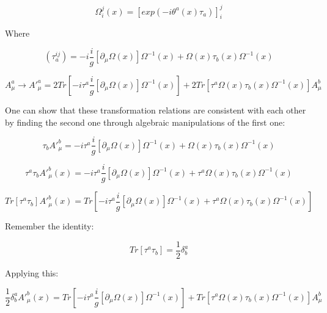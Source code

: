 \documentclass[a4]{article}
\begin{document}
    \begin{equation}
        \Omega_{i}^{j} (x) = [exp (-i \theta^{a} (x) \tau_{a})]_{i}^{j}
    \end{equation}

    Where

    \begin{equation}
        (\tau_{a}^{ij}) = - i \frac{i}{g} [\partial_{\mu} \Omega (x)] \Omega^{-1} (x) + \Omega (x) \tau_{b} (x) \Omega^{-1} (x)
    \end{equation}

    \begin{equation}
        A^{a}_{\mu} \rightarrow A'^{a}_{\mu} = 2 Tr [- i \tau^{a} \frac{i}{g} [\partial_{\mu} \Omega (x)] \Omega^{-1} (x)] + 2 Tr [\tau^{a} \Omega (x) \tau_{b} (x) \Omega^{-1} (x)] A_{\mu}^{b}
    \end{equation}

    One can show that these transformation relations are consistent with each other by finding the second one through algebraic manipulations
    of the first one:

    \begin{equation}
        \tau_{b} A'^{b}_{\mu} = - i \tau^{a} \frac{i}{g} [\partial_{\mu} \Omega (x)] \Omega^{-1} (x) + \Omega (x) \tau_{b} (x) \Omega^{-1} (x)
    \end{equation}

    \begin{equation}
        \tau^{a} \tau_{b} A'^{b}_{\mu} (x) = - i \tau^{a} \frac{i}{g} [\partial_{\mu} \Omega (x)] \Omega^{-1} (x) + \tau^{a} \Omega (x) \tau_{b} (x) \Omega^{-1} (x)
    \end{equation}

    \begin{equation}
        Tr[\tau^{a} \tau_{b}] A'^{b}_{\mu} (x) = Tr [- i \tau^{a} \frac{i}{g} [\partial_{\mu} \Omega (x)] \Omega^{-1} (x) + \tau^{a} \Omega (x) \tau_{b} (x) \Omega^{-1} (x)]
    \end{equation}

    Remember the identity:

    \begin{equation}
        Tr[\tau^{a} \tau_{b}] = \frac{1}{2} \delta^{a}_{b}
    \end{equation}

    Applying this:

    \begin{equation}
        \frac{1}{2} \delta_{b}^{a} A'^{b}_{\mu} (x) = Tr [- i \tau^{a} \frac{i}{g} [\partial_{\mu} \Omega (x)] \Omega^{-1} (x)] + Tr [\tau^{a} \Omega (x) \tau_{b} (x) \Omega^{-1} (x)] A_{\mu}^{b}
    \end{equation}
\end{document}
